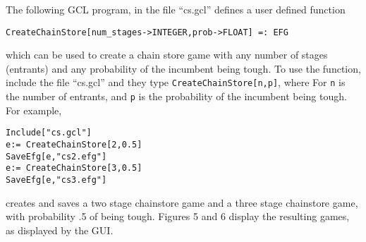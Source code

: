 The following GCL program, in the file ``cs.gcl'' defines a user
defined function

\begin{verbatim}
CreateChainStore[num_stages->INTEGER,prob->FLOAT] =: EFG
\end{verbatim}

\noindent
which can be used to create a chain store game with any number of
stages (entrants) and any probability of the incumbent being tough.
To use the function, include the file ``cs.gcl'' and they type
\verb+CreateChainStore[n,p]+, where For \verb+n+ is the number of
entrants, and \verb+p+ is the probability of the incumbent being
tough. For example, 

\begin{verbatim}
Include["cs.gcl"]
e:= CreateChainStore[2,0.5]
SaveEfg[e,"cs2.efg"]
e:= CreateChainStore[3,0.5]
SaveEfg[e,"cs3.efg"]
\end{verbatim}

\noindent
creates and saves a two stage chainstore game and a three stage
chainstore game, with probability .5 of being tough. Figures 5 and 6
display the resulting games, as displayed by the GUI. 

